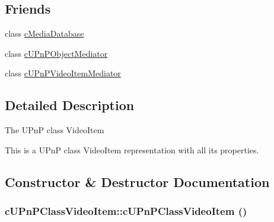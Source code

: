 \subsection*{Friends}
\begin{CompactItemize}
\item 
\hypertarget{classcUPnPClassVideoItem_3d0d0aedce8b1c661ea360b9a6d616f6}{
class \hyperlink{classcUPnPClassVideoItem_3d0d0aedce8b1c661ea360b9a6d616f6}{cMediaDatabase}}
\label{classcUPnPClassVideoItem_3d0d0aedce8b1c661ea360b9a6d616f6}

\item 
\hypertarget{classcUPnPClassVideoItem_aefab39434a832c545ac75a79fa81d23}{
class \hyperlink{classcUPnPClassVideoItem_aefab39434a832c545ac75a79fa81d23}{cUPnPObjectMediator}}
\label{classcUPnPClassVideoItem_aefab39434a832c545ac75a79fa81d23}

\item 
\hypertarget{classcUPnPClassVideoItem_e0d1a617e075a78abffc13ad3a3d341e}{
class \hyperlink{classcUPnPClassVideoItem_e0d1a617e075a78abffc13ad3a3d341e}{cUPnPVideoItemMediator}}
\label{classcUPnPClassVideoItem_e0d1a617e075a78abffc13ad3a3d341e}

\end{CompactItemize}


\subsection{Detailed Description}
The UPnP class VideoItem

This is a UPnP class VideoItem representation with all its properties. 

\subsection{Constructor \& Destructor Documentation}
\hypertarget{classcUPnPClassVideoItem_38ce1c18cc9d474791255fdcb43824d2}{
\subsubsection[{cUPnPClassVideoItem}]{\setlength{\rightskip}{0pt plus 5cm}cUPnPClassVideoItem::cUPnPClassVideoItem ()}}
\label{classcUPnPClassVideoItem_38ce1c18cc9d474791255fdcb43824d2}


